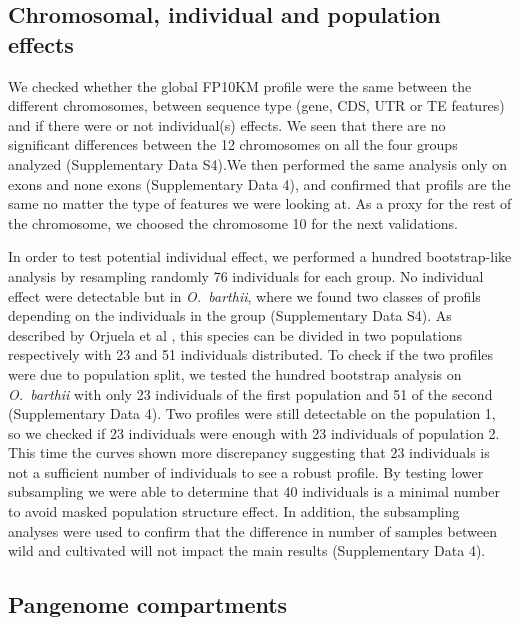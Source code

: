 \documentclass[10pt,letterpaper]{article}
\begin{document}
\subsection*{Chromosomal, individual and population effects}
We checked whether the global FP10KM profile were the same between the different chromosomes, between sequence type (gene, CDS, UTR or TE features) and if there were or not individual(s) effects. We seen that there are no significant differences between the 12 chromosomes on all the four groups analyzed (Supplementary Data S4).We then performed the same analysis only on exons and none exons  (Supplementary Data 4), and confirmed that profils are the same no matter the type of features we were looking at. As a proxy for the rest of the chromosome, we choosed the chromosome 10 for the next validations.

In order to test potential individual effect, we performed a hundred bootstrap-like analysis by resampling randomly 76 individuals for each group. No individual effect were detectable but in \textit{O.~barthii}, where we found two classes of profils depending on the individuals in the group (Supplementary Data S4). As described by Orjuela et al \cite{Orjuela2014}, this species can be divided in two populations respectively with 23 and 51 individuals distributed.
To check if the two profiles were due to population split, we tested the hundred bootstrap analysis on \textit{O.~barthii} with only 23 individuals of the first population and 51 of the second (Supplementary Data 4).
Two profiles were still detectable on the population 1, so we checked if 23 individuals were enough with 23 individuals of population 2. This time the curves shown more discrepancy suggesting that 23 individuals is not a sufficient number of individuals to see a robust profile. By testing lower subsampling we were able to determine that 40 individuals is a minimal number to avoid masked population structure effect.
In addition, the subsampling analyses were used to confirm that the difference in number of samples between wild and cultivated will not impact the main results (Supplementary Data 4).


\subsection*{Pangenome compartments}


\end{document}
